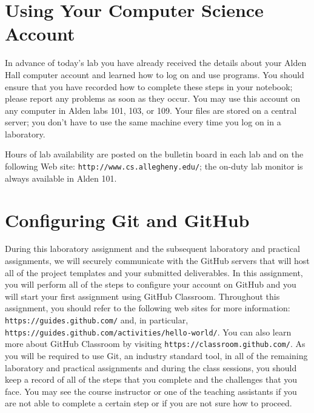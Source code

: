 \documentclass[11pt]{article}
\newcommand{\url}[1]{\lstinline{#1}}
\begin{document}
\section*{Using Your Computer Science Account}

In advance of today's lab you have already received the details about your Alden Hall computer account and learned how
to log on and use programs. You should ensure that you have recorded how to complete these steps in your notebook;
please report any problems as soon as they occur. You may use this account on any computer in Alden labs 101, 103, or
109. Your files are stored on a central server; you don't have to use the same machine every time you log on in a
laboratory.

Hours of lab availability are posted on the bulletin board in each lab and on the following Web site:
\url{http://www.cs.allegheny.edu/}; the on-duty lab monitor is always available in Alden 101.

\section*{Configuring Git and GitHub}

During this laboratory assignment and the subsequent laboratory and practical assignments, we will securely communicate
with the GitHub servers that will host all of the project templates and your submitted deliverables. In this assignment,
you will perform all of the steps to configure your account on GitHub and you will start your first assignment using
GitHub Classroom. Throughout this assignment, you should refer to the following web sites for more information:
\url{https://guides.github.com/} and, in particular, \url{https://guides.github.com/activities/hello-world/}. You can
also learn more about GitHub Classroom by visiting \url{https://classroom.github.com/}. As you will be required to use
Git, an industry standard tool, in all of the remaining laboratory and practical assignments and during the class
sessions, you should keep a record of all of the steps that you complete and the challenges that you face. You may see
the course instructor or one of the teaching assistants if you are not able to complete a certain step or if you are not
sure how to proceed.
\end{document}
